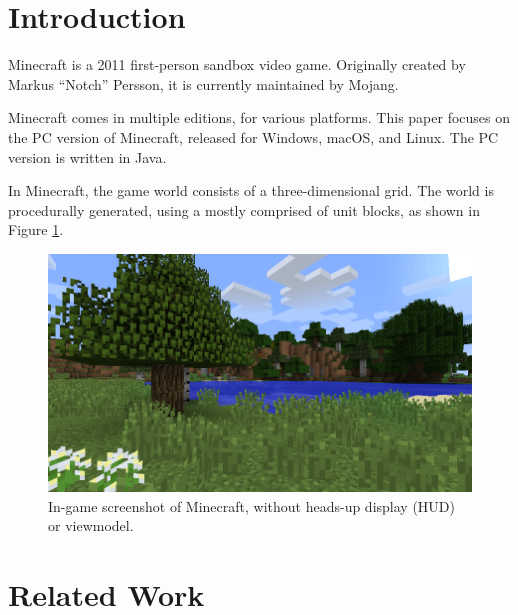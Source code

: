 \documentclass[]{article}
\begin{document}

\newpage
\tableofcontents
\newpage

\section{Introduction}
Minecraft is a 2011 first-person sandbox video game.
Originally created by Markus \enquote{Notch} Persson, it is currently maintained by Mojang.


Minecraft comes in multiple editions, for various platforms. This paper focuses on the PC version of Minecraft, released for Windows, macOS, and Linux.
The PC version is written in Java.

In Minecraft, the game world consists of a three-dimensional grid.
The world is procedurally generated, using a 
mostly comprised of unit blocks, as shown in Figure \ref{fig:ss-worldgen}.

\begin{figure}
  \includegraphics[width=\textwidth]{ss-worldgen.png}
  \centering
  \caption{In-game screenshot of Minecraft, without heads-up display (HUD) or viewmodel.}
  \label{fig:ss-worldgen}
\end{figure}

\section{Related Work}
\end{document}
